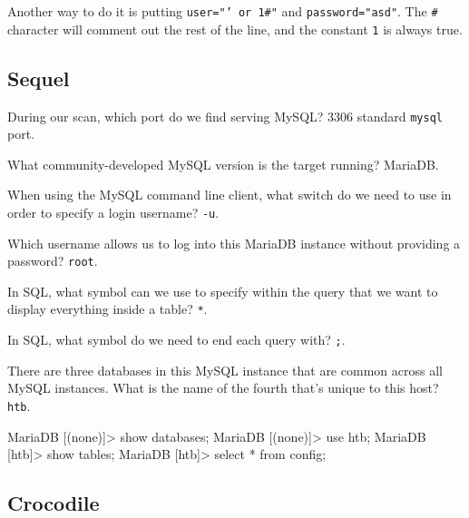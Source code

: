 \documentclass[a4paper,10pt]{article}
\begin{document}
\n

Another way to do it is putting \texttt{user="' or 1#"} and \texttt{password="asd"}. The \texttt{#} character will comment out the rest of the line, and the constant \texttt{1} is always true.

\subsection{Sequel \faLinux}

During our scan, which port do we find serving MySQL? 3306 standard \texttt{mysql} port.

What community-developed MySQL version is the target running? MariaDB.

When using the MySQL command line client, what switch do we need to use in order to specify a login username? \texttt{-u}.

Which username allows us to log into this MariaDB instance without providing a password? \texttt{root}.

In SQL, what symbol can we use to specify within the query that we want to display everything inside a table? \texttt{*}.

In SQL, what symbol do we need to end each query with? \texttt{;}.

There are three databases in this MySQL instance that are common across all MySQL instances. What is the name of the fourth that's unique to this host? \texttt{htb}.
\begin{sql}
MariaDB [(none)]> show databases;
MariaDB [(none)]> use htb;
MariaDB [htb]> show tables;
MariaDB [htb]> select * from config;
\end{sql}

\subsection{Crocodile \faLinux}
\end{document}
